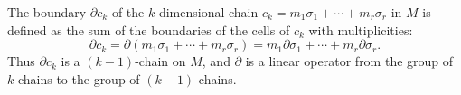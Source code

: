 The boundary $\partial c_k$ of the $k$-dimensional chain $c_k = m_1 \sigma_1 + \cdots + m_r \sigma_r$ in $M$ is defined as the sum of the boundaries of the cells of $c_k$ with multiplicities:
$$\partial c_k = \partial(m_1 \sigma_1 + \cdots + m_r \sigma_r) = m_1 \partial \sigma_1 + \cdots + m_r \partial \sigma_r.$$
Thus $\partial c_k$ is a $(k-1)$-chain on $M$, and $\partial$ is a linear operator from the group of $k$-chains to the group of $(k-1)$-chains.

